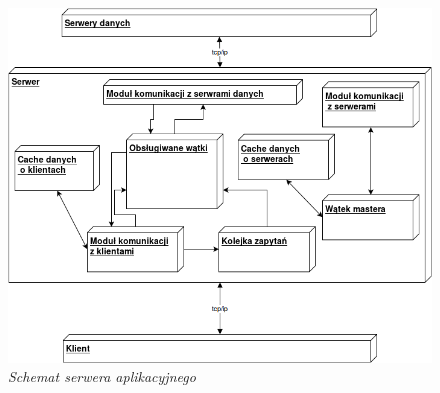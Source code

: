 \begin{figure}[!h]
    \begin{center}
    \includegraphics[angle=0,scale=0.6]{img/serv.png}
    \end{center}
    \caption{\em Schemat serwera aplikacyjnego}
    \label{fig:serv}
\end{figure}

